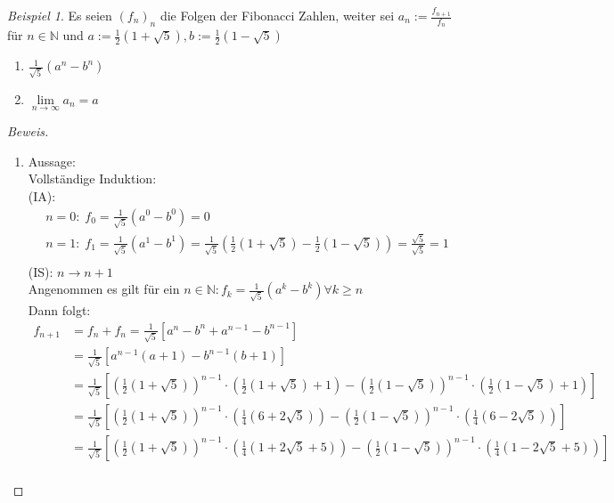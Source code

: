 \documentclass[12pt,a4paper,titlepage]{article} %
\theoremstyle{definition}
\theoremstyle{remark}
\newtheorem*{bsp}{Beispiel}
\newenvironment{bew}{\begin{proof}[Beweis]}{\end{proof}}
\newcommand{\N}{\mathbb{N}}
\newcommand{\limes}[1]{\lim\limits_{#1\rightarrow\infty}}
\begin{document}
	\begin{bsp}
		Es seien \((f_n)_n\) die Folgen der Fibonacci Zahlen, weiter sei \(a_n := \frac{f_{n+1}}{f_n}\) für \(n \in \N\) und \(a := \frac{1}{2}(1 + \sqrt{5}), b := \frac{1}{2}(1 - \sqrt{5})\)\\
		\begin{enumerate}
			\item \(\frac{1}{\sqrt{5}}\left(a^n-b^n\right)\)
			\item \(\limes{n} a_n = a\)
		\end{enumerate}
		\begin{bew}
			\begin{enumerate}
				\item Aussage:\\
					Vollständige Induktion:\\
					(IA):
					\begin{align*}
						&n = 0: \; f_0 = \frac{1}{\sqrt{5}} \left(a^0-b^0 \right) = 0\\		
						&n = 1: \; f_1 = \frac{1}{\sqrt{5}} \left(a^1-b^1 \right) = \frac{1}{\sqrt{5}} \left(\frac{1}{2}(1 + \sqrt{5})-\frac{1}{2}(1 - \sqrt{5}) \right) = \frac{\sqrt{5}}{\sqrt{5}} = 1\\		
					\end{align*}
					(IS): \(n \rightarrow n+1\)\\
					Angenommen es gilt für ein \(n \in \N: f_k = \frac{1}{\sqrt{5}}\left(a^k-b^k\right) \forall k \geq n\)\\
					Dann folgt:
					\begin{align*}
						f_{n+1} &= f_n + f_n = \frac{1}{\sqrt{5}}\left[a^n - b^n +a^{n-1} - b^{n-1}\right]\\
						&= \frac{1}{\sqrt{5}}\left[a^{n-1}(a+1) - b^{n-1}(b+1)\right]\\
						&= \frac{1}{\sqrt{5}}\left[\left(\frac{1}{2}\left(1 + \sqrt{5}\right)\right)^{n-1}\cdot\left(\frac{1}{2}\left(1 + \sqrt{5}\right)+1\right) - \left(\frac{1}{2}\left(1 - \sqrt{5}\right)\right)^{n-1}\cdot\left(\frac{1}{2}\left(1 - \sqrt{5}\right)+1\right)\right]\\
						&= \frac{1}{\sqrt{5}}\left[\left(\frac{1}{2}\left(1 + \sqrt{5}\right)\right)^{n-1}\cdot\left(\frac{1}{4}\left(6 + 2\sqrt{5}\right)\right) - \left(\frac{1}{2}\left(1 - \sqrt{5}\right)\right)^{n-1}\cdot\left(\frac{1}{4}\left(6 - 2\sqrt{5}\right)\right)\right]\\
						&= \frac{1}{\sqrt{5}}\left[\left(\frac{1}{2}\left(1 + \sqrt{5}\right)\right)^{n-1}\cdot\left(\frac{1}{4}\left(1 + 2\sqrt{5} + 5\right)\right) - \left(\frac{1}{2}\left(1 - \sqrt{5}\right)\right)^{n-1}\cdot\left(\frac{1}{4}\left(1 - 2\sqrt{5} + 5\right)\right)\right]\\

\end{align*}
\end{enumerate}
\end{bew}
\end{bsp}
\end{document}
